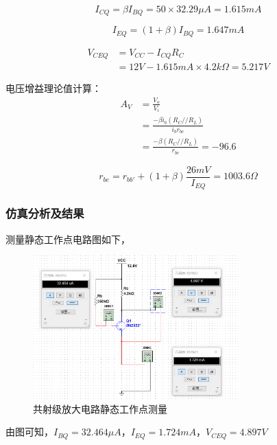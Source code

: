 \documentclass[10pt, conference, compsocconf, a4paper]{IEEEtran}
\begin{document}
\begin{equation}
  I_{CQ}=\beta I_{BQ}=50\times32.29\mu A=1.615mA
\end{equation}

\begin{equation}
  I_{EQ}=(1+\beta)I_{BQ}=1.647mA
\end{equation}

\begin{equation}
  \begin{split}
    V_{CEQ}&=V_{CC}-I_{CQ}R_C\\
    &=12V-1.615mA\times 4.2k\Omega=5.217V
  \end{split}
\end{equation}

电压增益理论值计算：
\begin{equation}
  \begin{split}
    A_V&=\frac{V_o}{V_i}\\
    &=\frac{-\beta i_b(R_C//R_L)}{i_br_{be}}\\
    &=\frac{-\beta(R_C//R_L)}{r_{be}}=-96.6
  \end{split}
\end{equation}

\begin{equation}
  r_{be}=r_{bb'}+(1+\beta)\frac{26mV}{I_{EQ}}=1003.6\Omega
\end{equation}

\subsubsection{仿真分析及结果}

测量静态工作点电路图如下，\par
\begin{figure}[h]
  \includegraphics[width=8cm]{img/a.png}
  \caption{共射级放大电路静态工作点测量}
\end{figure}
由图可知，$I_{BQ}=32.464\mu A，I_{EQ}=1.724mA，V_{CEQ}=4.897V$
\end{document}
